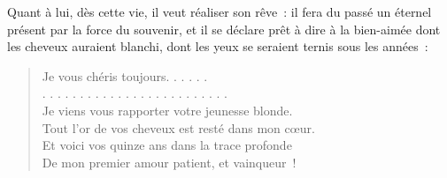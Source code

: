 \documentclass[french,twoside]{book} %
\begin{document}
\noindent Quant à lui, dès cette vie, il veut réaliser son rêve : il fera du passé un éternel présent par la force du souvenir, et il se déclare prêt à dire à la bien-aimée dont les cheveux auraient blanchi, dont les yeux se seraient ternis sous les années :\par


\begin{verse}
Je vous chéris toujours. . . . . .\\
. . . . . . . . . . . . . . . . . . . . . . . . .\\
Je viens vous rapporter votre jeunesse blonde.\\
Tout l’or de vos cheveux est resté dans mon cœur.\\
Et voici vos quinze ans dans la trace profonde\\
De mon premier amour patient, et vainqueur !\\
\end{verse}
\end{document}
